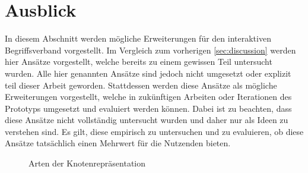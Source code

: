 \section{Ausblick}\label{sec:outlook}
In diesem Abschnitt werden mögliche Erweiterungen für den interaktiven Begriffsverband vorgestellt.
Im Vergleich zum vorherigen \autoref{sec:discussion} werden hier Ansätze vorgestellt, welche bereits zu einem gewissen Teil untersucht wurden.
Alle hier genannten Ansätze sind jedoch nicht umgesetzt oder explizit teil dieser Arbeit geworden.
Stattdessen werden diese Ansätze als mögliche Erweiterungen vorgestellt, welche in zukünftigen Arbeiten oder Iterationen des Prototyps umgesetzt und evaluiert werden können.
Dabei ist zu beachten, dass diese Ansätze nicht vollständig untersucht wurden und daher nur als Ideen zu verstehen sind.
Es gilt, diese empirisch zu untersuchen und zu evaluieren, ob diese Ansätze tatsächlich einen Mehrwert für die Nutzenden bieten. \\

\begin{figure}[!ht]
    \centering
    \caption{\label{fig:node-types}Arten der Knotenrepräsentation}
\end{figure}


